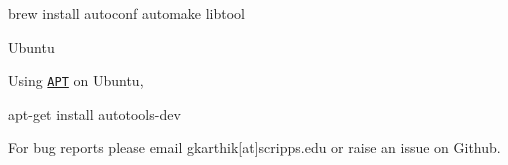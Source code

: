 \begin{DoxyCode}
brew install autoconf automake libtool
\end{DoxyCode}



\begin{DoxyItemize}
\item Ubuntu
\end{DoxyItemize}

Using \href{https://help.ubuntu.com/lts/serverguide/apt.html}{\tt A\+PT} on Ubuntu,


\begin{DoxyCode}
apt-get install autotools-dev
\end{DoxyCode}


For bug reports please email gkarthik\mbox{[}at\mbox{]}scripps.\+edu or raise an issue on Github. 